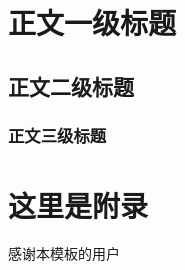 \documentclass{pkuthesis}
\author{学生姓名（作者）}
\begin{document}
\section{正文一级标题}
\subsection{正文二级标题}
\subsubsection{正文三级标题}
\printbibliography %

\appendix
\section{这里是附录}

\acknowledgments
感谢本模板的用户
\end{document}
